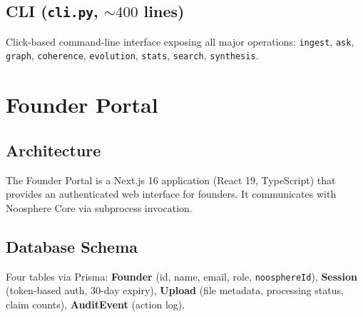 \documentclass[11pt,letterpaper]{article}
\begin{document}
\subsection{CLI (\texttt{cli.py}, ${\sim}400$ lines)}

Click-based command-line interface exposing all major operations: \texttt{ingest}, \texttt{ask}, \texttt{graph}, \texttt{coherence}, \texttt{evolution}, \texttt{stats}, \texttt{search}, \texttt{synthesis}.

\section{Founder Portal}

\subsection{Architecture}

The Founder Portal is a Next.js 16 application (React 19, TypeScript) that provides an authenticated web interface for founders. It communicates with Noosphere Core via subprocess invocation.

\begin{center}
\end{center}

\subsection{Database Schema}

Four tables via Prisma: \textbf{Founder} (id, name, email, role, \texttt{noosphereId}), \textbf{Session} (token-based auth, 30-day expiry), \textbf{Upload} (file metadata, processing status, claim counts), \textbf{AuditEvent} (action log).
\end{document}
